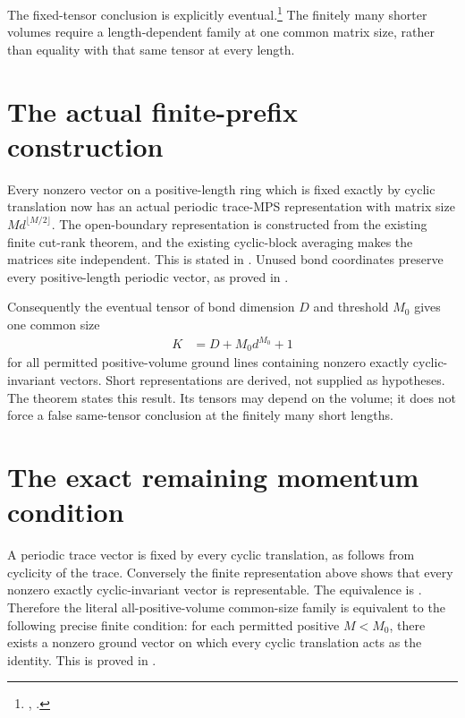 \documentclass{article}
\begin{document}
The fixed-tensor conclusion is explicitly
eventual.\footnote{,
.} The finitely many
shorter volumes require a length-dependent family at one common matrix
size, rather than equality with that same tensor at every length.

\section{The actual finite-prefix construction}

Every nonzero vector on a positive-length ring which is fixed exactly by
cyclic translation now has an actual periodic trace-MPS representation
with matrix size $M d^{\lfloor M/2\rfloor}$. The open-boundary
representation is constructed from the existing finite cut-rank theorem,
and the existing cyclic-block averaging makes the matrices site
independent. This is stated in
.
Unused bond coordinates preserve every positive-length periodic vector,
as proved in .

Consequently the eventual tensor of bond dimension $D$ and threshold
$M_0$ gives one common size
\begin{align}
    K & = D+M_0d^{M_0}+1
    \label{eq:spwc10_finite_prefix_common_size}
\end{align}
for all permitted positive-volume ground lines containing nonzero
exactly cyclic-invariant vectors. Short representations are derived,
not supplied as hypotheses. The theorem
states this result. Its tensors may depend on the volume; it does not
force a false same-tensor conclusion at the finitely many short lengths.

\section{The exact remaining momentum condition}

A periodic trace vector is fixed by every cyclic translation, as follows
from cyclicity of the trace. Conversely the finite representation above
shows that every nonzero exactly cyclic-invariant vector is representable.
The equivalence is
.
Therefore the literal all-positive-volume common-size family is equivalent
to the following precise finite condition: for each permitted positive
$M<M_0$, there exists a nonzero ground vector on which every cyclic
translation acts as the identity. This is proved in
.
\end{document}
